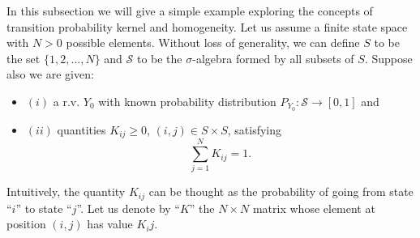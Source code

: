 In this subsection we will give a simple example exploring the concepts of transition probability kernel and homogeneity.
Let us assume a finite state space with $N>0$ possible elements.
Without loss of generality, we can define $S$ to be the set $\{1,2,\ldots,N\}$ and $\mathcal{S}$ to be the $\sigma$-algebra formed by all subsets of $S$.
Suppose also we are given:
{\renewcommand{\labelitemi}{}
\begin{itemize}
\item $(i)$ a r.v. $Y_0$ with known probability distribution $P_{Y_0}:\mathcal{S}\rightarrow [0,1]$ and
\item {$(ii)$ quantities ${K}_{ij}\geqslant 0$, $(i,j)\in S\times S$, satisfying
\begin{equation*}
\sum_{j=1}^{N}{K}_{ij} = 1.
\end{equation*}
}
\end{itemize}
}
Intuitively, the quantity ${K}_{ij}$ can be thought as the probability of going from state ``$i$'' to state ``$j$''.
Let us denote by ``$K$'' the $N\times N$ matrix whose element at position $(i,j)$ has value ${K}_ij$.

